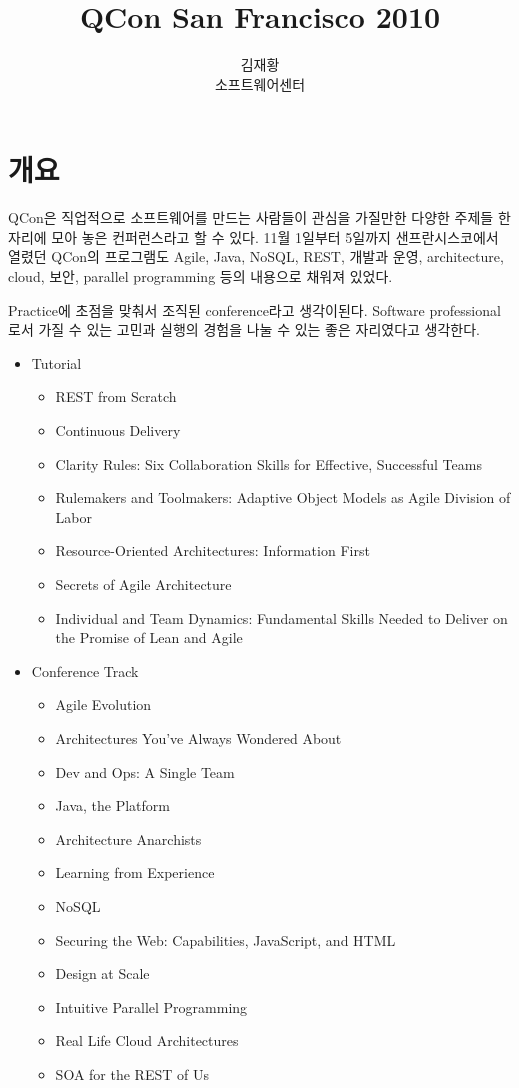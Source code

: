 \documentclass[11pt]{article}
\title{QCon San Francisco 2010}
\author{김재황 \\ 소프트웨어센터}
\begin{document}
\maketitle

\section{개요}

QCon은 직업적으로 소프트웨어를 만드는 사람들이 관심을 가질만한 
다양한 주제들 한 자리에 모아 놓은 컨퍼런스라고 할 수 있다. 
11월 1일부터 5일까지 샌프란시스코에서 열렸던 QCon의 프로그램도 Agile, Java, 
NoSQL, REST, 개발과 운영, architecture, cloud, 보안, parallel programming
등의 내용으로 채워져 있었다. 

Practice에 초점을 맞춰서 조직된 conference라고 생각이된다. Software 
professional로서 가질 수 있는 고민과 실행의 경험을 나눌 수 있는 좋은 
자리였다고 생각한다.


\begin{itemize}
\item Tutorial
    \begin{itemize}
    \item REST from Scratch
    \item Continuous Delivery
    \item  Clarity Rules: Six Collaboration Skills for Effective, Successful Teams
    \item Rulemakers and Toolmakers: Adaptive Object Models as Agile Division of Labor
    \item Resource-Oriented Architectures: Information First
    \item Secrets of Agile Architecture
    \item Individual and Team Dynamics: Fundamental Skills Needed to Deliver on the Promise of Lean and Agile
    \end{itemize}
\item Conference Track
    \begin{itemize}
    \item Agile Evolution
    \item Architectures You've Always Wondered About
    \item Dev and Ops: A Single Team
    \item Java, the Platform
    \item Architecture Anarchists
    \item Learning from Experience
    \item NoSQL
    \item Securing the Web: Capabilities, JavaScript, and HTML
    \item Design at Scale
    \item Intuitive Parallel Programming
    \item Real Life Cloud Architectures
    \item SOA for the REST of Us
    \end{itemize}
\end{itemize}
\end{document}
